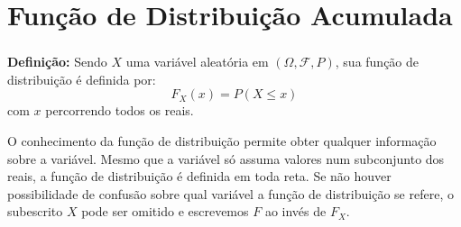 \documentclass[14pt,aspectratio=1610]{beamer}
\begin{document}
\begin{frame}{}
\frametitle{}
\end{frame}

\section{Função de Distribuição Acumulada}
\begin{frame}{}
\frametitle{}
\begin{block}{}
\justifying
\textbf{Definição:} Sendo $X$ uma variável aleatória em $(\Omega, \mathcal{F}, P)$, sua função de distribuição é definida por: $$F_{X}(x)=P(X\leq x)$$ com $x$ percorrendo 
todos os reais.

O conhecimento da função de distribuição permite obter qualquer informação sobre a variável. Mesmo que a variável só assuma valores num subconjunto dos reais, a 
função de distribuição é definida em toda reta. Se não houver possibilidade de confusão sobre qual variável a função de distribuição se refere, o subescrito $X$ pode 
ser omitido e escrevemos $F$ ao invés de $F_{X}.$
\end{block}
\end{frame}
\end{document}
